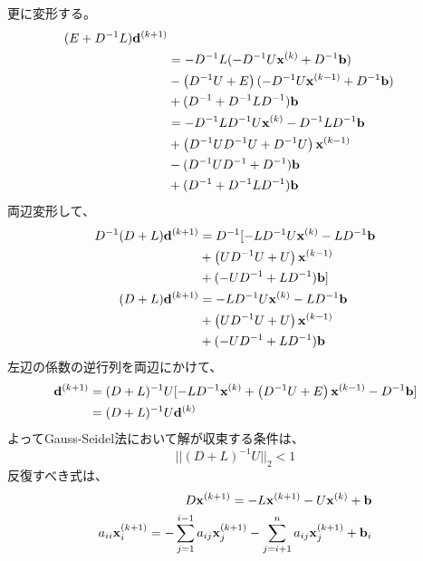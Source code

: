 \documentclass[twocolumn]{jsarticle}
\newcommand{\kakko}[1][]{(#1)}
\newcommand{\bx}{\bold{x}}
\newcommand{\bb}{\bold{b}}
\newcommand{\bd}{\bold{d}}
\begin{document}
更に変形する。
\begin{align*}
  (E + D^{-1}L)\bd^{\kakko[k+1]} \\ 
& = - D^{-1}L (- D^{-1} U \bx^{\kakko[k]} + D^{-1}\bold{b})\\
&- \left( D^{-1}U+ E\right) (- D^{-1} U \bx^{\kakko[k-1]} + D^{-1}\bold{b})\\
&+ (D^{-1} + D^{-1} L D^{-1}) \bb\\
&=  - D^{-1}L D^{-1} U \bx^{\kakko[k]} - D^{-1}L D^{-1}\bold{b}\\
&+ \left( D^{-1}UD^{-1} U+ D^{-1} U\right)  \bx^{\kakko[k-1]} \\
&-( D^{-1}UD^{-1} + D^{-1})\bold{b}\\
&+ (D^{-1} + D^{-1} L D^{-1})\bb
\end{align*}
両辺変形して、
\begin{align*}
D^{-1}(D + L)\bd^{\kakko[k+1]} &= D^{-1} [-L D^{-1} U \bx^{\kakko[k]} - L D^{-1}\bold{b}\\
&+ \left( UD^{-1} U+ U\right)  \bx^{\kakko[k-1]} \\
&+(-UD^{-1} + LD^{-1})\bold{b}]\\
(D + L)\bd^{\kakko[k+1]}&= - L D^{-1} U \bx^{\kakko[k]} - L D^{-1}\bold{b}\\
&+ \left( UD^{-1} U+ U\right)  \bx^{\kakko[k-1]} \\
& + (-UD^{-1} + LD^{-1})\bold{b}\\
\end{align*}
左辺の係数の逆行列を両辺にかけて、
\begin{align*}
\bd^{\kakko[k+1]} &= (D + L)^{-1}U[- L D^{-1}  \bx^{\kakko[k]} + \left( D^{-1} U+ E\right) \bx^{\kakko[k-1]}
-D^{-1}\bold{b}]\\
&= (D + L)^{-1}U\bd^{\kakko[k]}\\
\end{align*}
よってGauss-Seidel法において解が収束する条件は、
\begin{equation}
    ||(D + L)^{-1}U||_2 < 1
\end{equation}
反復すべき式は、
\begin{align}
    D\bx^{\kakko[k+1]} = - L\bx^{\kakko[k+1]} - U\bx^{\kakko[k]}+\bb\\
    a_{ii}\bx^{\kakko[k+1]}_i =
    - \sum^{i-1}_{j=1} a_{ij}\bx^{\kakko[k+1]}_j- \sum^{n}_{j=i+1}a_{ij}\bx^{\kakko[k+1]}_j+\bb_i
\end{align}
\end{document}
